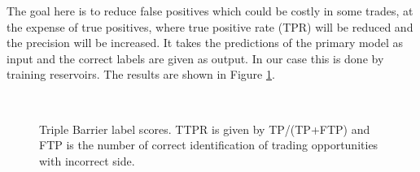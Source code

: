 \documentclass{article}
\begin{document}
The goal here is to reduce false positives which could be costly in some trades, at the expense of true positives, where true positive rate (TPR) will be reduced and the precision will be increased. It takes the predictions of the primary model as input and the correct labels are given as output. In our case this is done by training reservoirs. The results are shown in Figure \ref{fig:triple_label_scores}.

\begin{figure}[!htbp]
  \centering
   \\
  \caption{Triple Barrier label scores. TTPR is given by TP/(TP+FTP) and FTP is the number of correct identification of trading opportunities with incorrect side.} \label{fig:triple_label_scores}
\end{figure}
\end{document}
